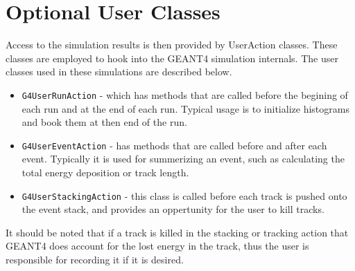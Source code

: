 \section{Optional User Classes}
Access to the simulation results is then provided by UserAction classes.
These classes are employed to hook into the GEANT4 simulation internals.
The user classes used in these simulations are described below.
\begin{itemize}
  \item \verb+G4UserRunAction+ - which has methods that are called before the begining of each run and at the end of each run. Typical usage is to initialize histograms and book them at then end of the run.
  \item \verb+G4UserEventAction+ - has methods that are called before and after each event. Typically it is used for summerizing an event, such as calculating the total energy deposition or track length.
  \item \verb+G4UserStackingAction+ - this class is called before each track is pushed onto the event stack, and provides an oppertunity for the user to kill tracks.
\end{itemize}
It should be noted that if a track is killed in the stacking or tracking action that GEANT4 does account for the lost energy in the track, thus the user is responsible for recording it if it is desired.
